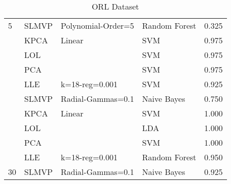 \begin{table}
\begin{tabular}{llllr}
        \multirow{-3}{*}{5}                      & SLMVP          & Polynomial-Order=5 & Random Forest & 0.325    \\
        \rowcolor{lightgray}                     & KPCA           & Linear             & SVM           & 0.975    \\
        \rowcolor{lightgray}                     & LOL            &                    & SVM           & 0.975    \\
        \rowcolor{lightgray}                     & PCA            &                    & SVM           & 0.975    \\
        \rowcolor{lightgray}                     & LLE            & k=18-reg=0.001     & SVM           & 0.925    \\
        \rowcolor{lightgray}\multirow{-3}{*}{15} & SLMVP          & Radial-Gammas=0.1  & Naive Bayes   & 0.750    \\
                                                 & KPCA           & Linear             & SVM           & 1.000    \\
                                                 & LOL            &                    & LDA           & 1.000    \\
                                                 & PCA            &                    & SVM           & 1.000    \\
                                                 & LLE            & k=18-reg=0.001     & Random Forest & 0.950    \\
        \multirow{-3}{*}{30}                     & SLMVP          & Radial-Gammas=0.1  & Naive Bayes   & 0.925    \\
        \bottomrule
    \end{tabular}
    \caption{ORL Dataset}
    \label{annex-tab:orl-dataset}
\end{table}

